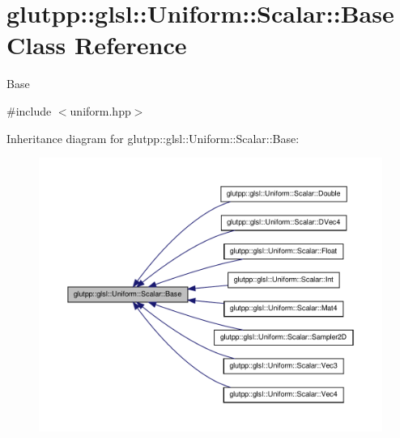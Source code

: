 \hypertarget{classglutpp_1_1glsl_1_1Uniform_1_1Scalar_1_1Base}{\section{glutpp\-:\-:glsl\-:\-:\-Uniform\-:\-:\-Scalar\-:\-:\-Base \-Class \-Reference}
\label{classglutpp_1_1glsl_1_1Uniform_1_1Scalar_1_1Base}
}


\-Base  




{\ttfamily \#include $<$uniform.\-hpp$>$}



\-Inheritance diagram for glutpp\-:\-:glsl\-:\-:\-Uniform\-:\-:\-Scalar\-:\-:\-Base\-:\nopagebreak
\begin{figure}[H]
\begin{center}
\leavevmode
\includegraphics[width=350pt]{classglutpp_1_1glsl_1_1Uniform_1_1Scalar_1_1Base__inherit__graph}
\end{center}
\end{figure}
